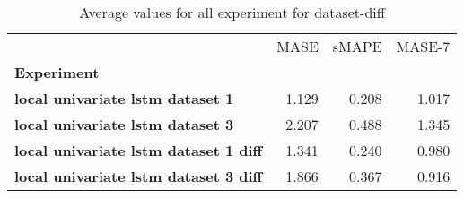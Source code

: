 \begin{table}[h]
\centering
\caption{Average values for all experiment for dataset-diff}
\label{table:Average-metric-dataset-diff}
\begin{tabular}{lrrr}
\toprule
{} &   MASE &  sMAPE &  MASE-7 \\
\textbf{Experiment                          } &        &        &         \\
\midrule
\textbf{local univariate lstm dataset 1     } &  1.129 &  0.208 &   1.017 \\
\textbf{local univariate lstm dataset 3     } &  2.207 &  0.488 &   1.345 \\
\textbf{local univariate lstm dataset 1 diff} &  1.341 &  0.240 &   0.980 \\
\textbf{local univariate lstm dataset 3 diff} &  1.866 &  0.367 &   0.916 \\
\bottomrule
\end{tabular}
\end{table}
